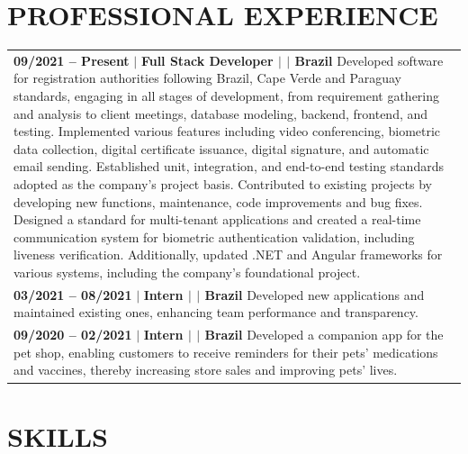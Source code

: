 \documentclass[letterpaper,11pt]{article}
\begin{document}
\section{PROFESSIONAL EXPERIENCE}
{
    \begin{tabularx}{\textwidth}{@{}X@{}}
        {
            \textbf{09/2021 -- Present} $\vert$ \textbf{Full Stack Developer $\vert$ \href{https://www.lacunasoftware.com/}{\color{blue}{Lacuna Software}} $\vert$ Brazil} \newline
            Developed software for registration authorities following Brazil, Cape Verde and Paraguay standards, engaging in all stages of development, from requirement gathering and analysis to client meetings, database modeling, backend, frontend, and testing. Implemented various features including video conferencing, biometric data collection, digital certificate issuance, digital signature, and automatic email sending. Established unit, integration, and end-to-end testing standards adopted as the company's project basis. Contributed to existing projects by developing new functions, maintenance, code improvements and bug fixes. Designed a standard for multi-tenant applications and created a real-time communication system for biometric authentication validation, including liveness verification. Additionally, updated .NET and Angular frameworks for various systems, including the company's foundational project.
        } \\
        {
            \textbf{03/2021 -- 08/2021} $\vert$ \textbf{Intern $\vert$ \href{https://portal.tcu.gov.br/inicio/}{\color{blue}{Federal Court of Accounts (TCU)}} $\vert$ Brazil} \newline
            Developed new applications and maintained existing ones, enhancing team performance and transparency.
        } \\
        {
            \textbf{09/2020 -- 02/2021} $\vert$ \textbf{Intern $\vert$ \href{https://www.companhiadaterra.com/}{\color{blue}{Companhia da Terra}} $\vert$ Brazil} \newline
            Developed a companion app for the pet shop, enabling customers to receive reminders for their pets' medications and vaccines, thereby increasing store sales and improving pets' lives.
        } \\
    \end{tabularx}
}


\section{SKILLS}
\end{document}
